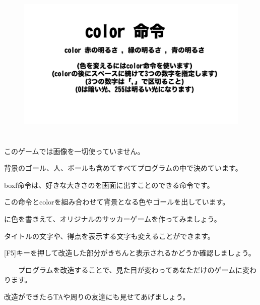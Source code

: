 \begin{figure}[H]
    \begin{center}
      \includegraphics[keepaspectratio,width=12.409cm,height=7.62cm]{text04-img/text04-img009.png}
    \end{center}
    \label{fig:prog_menu}
\end{figure}


このゲームでは画像を一切使っていません。

背景のゴール、人、ボールも含めてすべてプログラムの中で決めています。

boxf命令は、好きな大きさのを画面に出すことのできる命令です。

この命令とcolorを組み合わせて背景となる色やゴールを出しています。



に色を書きえて、オリジナルのサッカーゲームを作ってみましょう。

タイトルの文字や、得点を表示する文字も変えることができます。




\begin{description}
    \item {}
\end{description}


[F5]キーを押して改造した部分がきちんと表示されるかどうか確認しましょう。

\ \ \ \ プログラムを改造することで、見た目が変わってあなただけのゲームに変わります。

改造ができたらTAや周りの友達にも見せてあげましょう。